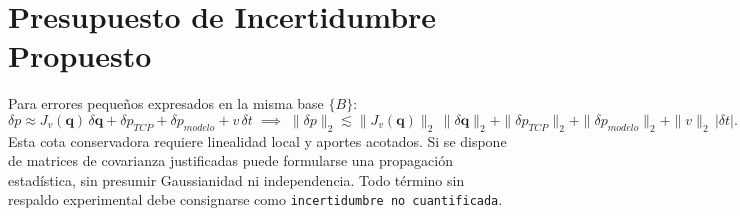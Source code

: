 \documentclass[10.5pt, a4paper]{article}
\begin{document}
\section{Presupuesto de Incertidumbre Propuesto}
Para errores pequeños expresados en la misma base $\{B\}$:
\begin{equation}
    \delta p \approx J_v(\mathbf{q})\,\delta\mathbf{q} + \delta p_{TCP} + \delta p_{modelo} + v\,\delta t \;\implies\;
    \boxed{ \|\delta p\|_2 \lesssim \|J_v(\mathbf{q})\|_2\,\|\delta\mathbf{q}\|_2 + \|\delta p_{TCP}\|_2 + \|\delta p_{modelo}\|_2 + \|v\|_2\,|\delta t| }.
\end{equation}
Esta cota conservadora requiere linealidad local y aportes acotados. Si se dispone de matrices de covarianza justificadas puede formularse una propagación estadística, sin presumir Gaussianidad ni independencia. Todo término sin respaldo experimental debe consignarse como \texttt{incertidumbre no cuantificada}.
\end{document}

